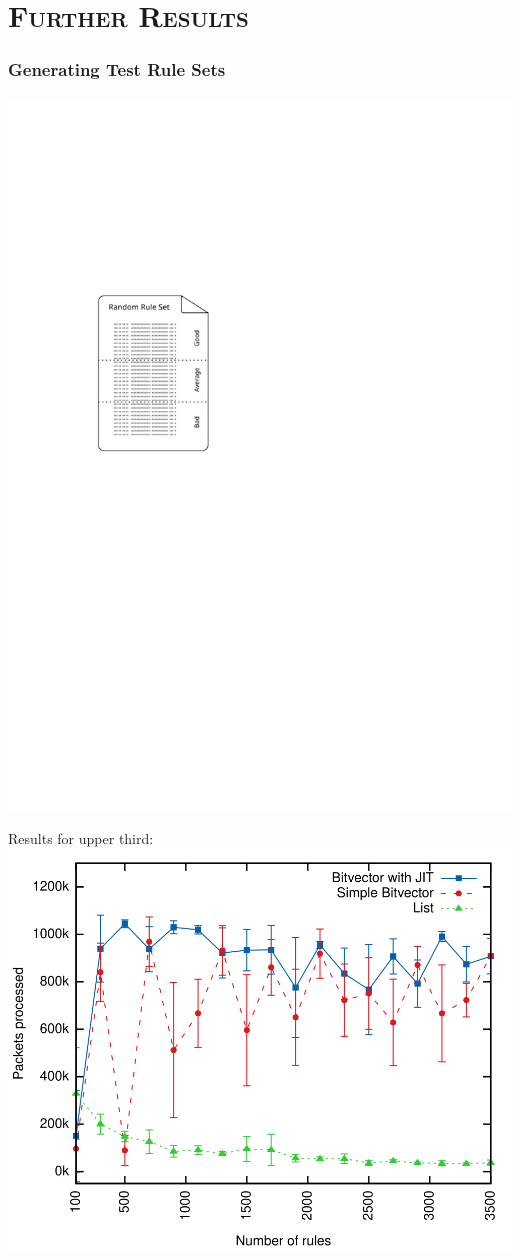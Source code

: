 \documentclass[xcolor=x11names,compress]{beamer}
\renewcommand{\(}{\begin{columns}}
\renewcommand{\)}{\end{columns}}
\newcommand{\<}[1]{\begin{column}{#1}}
\renewcommand{\>}{\end{column}}
\begin{document}
\section{\scshape Further Results}
\begin{frame}[noframenumbering]
  \frametitle{Generating Test Rule Sets}
  \centering\includegraphics[height=0.9\textheight]{figures/rule-thirds}
\end{frame}

\begin{frame}[noframenumbering]
  Results for upper third:
  \includegraphics[height=0.9\textheight]{figures/eval_b}
\end{frame}
\end{document}
